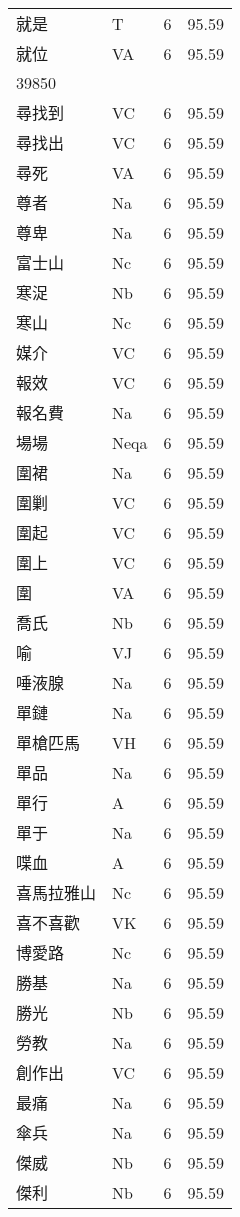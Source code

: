 \documentclass[twocolumn]{book}
\begin{document}
\begin{supertabular}{llrr}
就是 & T & 6 &  95.59\\
就位 & VA & 6 &  95.59\\
39850\\
尋找到 & VC & 6 &  95.59\\
尋找出 & VC & 6 &  95.59\\
尋死 & VA & 6 &  95.59\\
尊者 & Na & 6 &  95.59\\
尊卑 & Na & 6 &  95.59\\
富士山 & Nc & 6 &  95.59\\
寒浞 & Nb & 6 &  95.59\\
寒山 & Nc & 6 &  95.59\\
媒介 & VC & 6 &  95.59\\
報效 & VC & 6 &  95.59\\
報名費 & Na & 6 &  95.59\\
場場 & Neqa & 6 &  95.59\\
圍裙 & Na & 6 &  95.59\\
圍剿 & VC & 6 &  95.59\\
圍起 & VC & 6 &  95.59\\
圍上 & VC & 6 &  95.59\\
圍 & VA & 6 &  95.59\\
喬氏 & Nb & 6 &  95.59\\
喻 & VJ & 6 &  95.59\\
唾液腺 & Na & 6 &  95.59\\
單鏈 & Na & 6 &  95.59\\
單槍匹馬 & VH & 6 &  95.59\\
單品 & Na & 6 &  95.59\\
單行 & A & 6 &  95.59\\
單于 & Na & 6 &  95.59\\
喋血 & A & 6 &  95.59\\
喜馬拉雅山 & Nc & 6 &  95.59\\
喜不喜歡 & VK & 6 &  95.59\\
博愛路 & Nc & 6 &  95.59\\
勝基 & Na & 6 &  95.59\\
勝光 & Nb & 6 &  95.59\\
勞教 & Na & 6 &  95.59\\
創作出 & VC & 6 &  95.59\\
最痛 & Na & 6 &  95.59\\
傘兵 & Na & 6 &  95.59\\
傑威 & Nb & 6 &  95.59\\
傑利 & Nb & 6 &  95.59\\

\end{supertabular}
\end{document}

